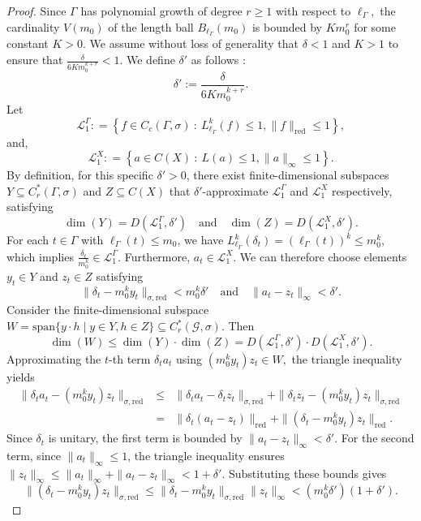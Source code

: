 \documentclass[10pt,a4paper]{amsart}
\newcommand{\Bea}{\begin{eqnarray*}}
\newcommand{\Eea}{\end{eqnarray*}}
\begin{document}
\begin{proof}
Since $\Gamma$ has polynomial growth of degree $r \geq 1$ with respect to $\ell_{\Gamma},$ the cardinality $V \left (m_0 \right )$ of the length ball $B_{\ell_{\Gamma}} (m_0)$ is bounded by $K m_0^{r}$ for some constant $K > 0.$ We assume without loss of generality that $\delta < 1$ and $K > 1$ to ensure that $\frac{\delta}{6 K m_0^{k + r}} < 1$. We define $\delta'$ as follows $:$
$$\delta' := \frac{\delta}{6 K m_0^{k + r}}.$$
Let $$\mathcal L_1^{\Gamma} : = \left \{f \in C_c (\Gamma, \sigma)\ :\ L_{\ell_{\Gamma}}^{k} (f) \leq 1, \|f\|_{\mathrm {red}} \leq 1 \right \},$$
and, $$\mathcal L_1^{X} : = \left \{a \in C(X)\ :\ L(a) \leq 1, \|a\|_{\infty} \leq 1 \right \}.$$
By definition, for this specific $\delta' > 0$, there exist finite-dimensional subspaces $Y \subseteq C_r^*(\Gamma, \sigma)$ and $Z \subseteq C(X)$ that $\delta'$-approximate $\mathcal{L}_1^{\Gamma}$ and $\mathcal{L}_1^X$ respectively, satisfying
$$\dim(Y) = D(\mathcal{L}_1^{\Gamma}, \delta') \quad \text{and} \quad \dim(Z) = D(\mathcal{L}_1^X, \delta').$$
For each $t \in \Gamma$ with $\ell_{\Gamma} (t) \le m_0$, we have $L_{\ell_{\Gamma}}^k(\delta_t) = (\ell_{\Gamma} (t))^k \le m_0^k$, which implies $\frac{\delta_t}{m_0^k} \in \mathcal{L}_1^{\Gamma}.$ Furthermore, $a_t \in \mathcal{L}_1^X$. We can therefore choose elements $y_t \in Y$ and $z_t \in Z$ satisfying
$$\|\delta_t - m_0^k y_t\|_{\sigma, \mathrm{red}} < m_0^k \delta' \quad \text{and} \quad \|a_t - z_t\|_{\infty} < \delta'.$$
Consider the finite-dimensional subspace $W = \mathrm{span}\{ y \cdot h \mid y \in Y, h \in Z \} \subseteq C_r^*(\mathcal{G}, \sigma)$. Then
$$\dim(W) \le \dim(Y) \cdot \dim(Z) = D(\mathcal{L}_1^{\Gamma}, \delta') \cdot D(\mathcal{L}_1^X, \delta').$$
Approximating the $t$-th term $\delta_t a_t$ using $(m_0^k y_t) z_t \in W,$ the triangle inequality yields
\Bea
    \| \delta_t a_t - (m_0^k y_t) z_t \|_{\sigma, \mathrm{red}} & \leq & \| \delta_t a_t - \delta_t z_t \|_{\sigma, \mathrm{red}} + \|\delta_t z_t - (m_0^k y_t) z_t \|_{\sigma, \mathrm{red}} \\
    & = & \| \delta_t (a_t - z_t) \|_{\mathrm{red}} + \| (\delta_t - m_0^k y_t) z_t \|_{\mathrm{red}}.
\Eea
Since $\delta_t$ is unitary, the first term is bounded by $\|a_t - z_t\|_{\infty} < \delta'$. For the second term, since $\|a_t\|_{\infty} \le 1$, the triangle inequality ensures $\|z_t\|_{\infty} \le \|a_t\|_{\infty} + \|a_t - z_t\|_{\infty} < 1 + \delta'$. Substituting these bounds gives
$$\| (\delta_t - m_0^k y_t) z_t \|_{\sigma, \mathrm{red}} \le \| \delta_t - m_0^k y_t \|_{\sigma, \mathrm{red}} \| z_t \|_{\infty} < (m_0^k \delta')(1 + \delta').$$

\end{proof}
\end{document}
